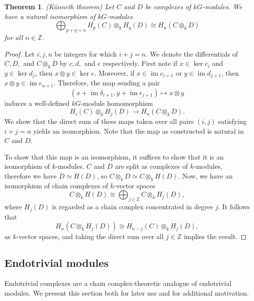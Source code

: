 \documentclass[10pt,letterpaper, boxed, cm]{amsart}
\newcommand{\Z}{\mathbb{Z}}
\newcommand{\im}{\operatorname{im}}
\newtheorem{theorem}{Theorem}[section]
\theoremstyle{remark}
\theoremstyle{definition}
\begin{document}
	\begin{theorem}{(K\"unneth theorem)} \label{kunneth}
		Let $C$ and $D$ be complexes of $kG$-modules. We have a natural isomorphism of $kG$-modules \[\bigoplus_{p+q = n} H_p(C) \otimes_k H_q(D) \cong H_n(C\otimes_k D)\] for all $n \in \Z$.
	\end{theorem}

	\begin{proof}
		Let $i, j, n$ be integers for which $i+j = n$. We denote the differentials of $C,D,$ and $C\otimes_k D$ by $c, d,$ and $e$ respectively. First note if $x \in \ker c_i$ and $y \in \ker d_j$, then $x\otimes y \in \ker e$. Moreover, if $x \in \im c_{i+1}$ or $y \in \im d_{j+1}$, then $x \otimes y \in \im e_{n + 1}$. Therefore, the map sending a pair \[(x + \im \delta_{i+1}, y + \im \epsilon_{j+1}) \mapsto x\otimes y\] induces a well-defined $kG$-module homomorphism \[H_i(C) \otimes_k H_j(D) \to H_n(C\otimes_k D).\] We show that the direct sum of these maps taken over all pairs $(i,j)$ satisfying $i+j = n$ yields an isomorphism. Note that the map as constructed is natural in $C$ and $D$.

        To show that this map is an isomorphism, it suffices to show that it is an isomorphism of $k$-modules. $C$ and $D$ are split as complexes of $k$-modules, therefore we have $D \simeq H(D)$, so $C \otimes_k D \simeq C \otimes_k H(D)$. Now, we have an isomorphism of chain complexes of $k$-vector spaces \[C \otimes_k H(D) \cong \bigoplus_{j \in \Z} C \otimes_k H_j(D),\] where $H_j(D)$ is regarded as a chain complex concentrated in degree $j$. It follows that \[H_n(C \otimes_k H_j(D)) \cong H_{n-j}(C) \otimes_k H_j(D),\] as $k$-vector spaces, and taking the direct sum over all $j \in \Z$ implies the result.
	\end{proof}

	\subsection{Endotrivial modules}

	Endotrivial complexes are a chain complex-theoretic analogue of endotrivial modules. We present this section both for later use and for additional motivation.
\end{document}

